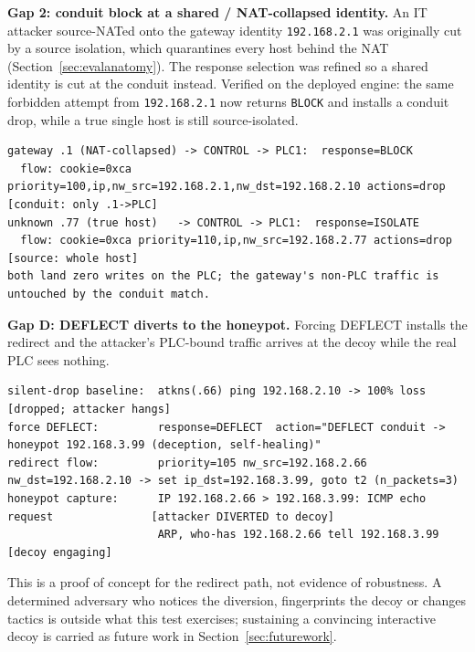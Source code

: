 \noindent\textbf{Gap 2: conduit block at a shared / NAT-collapsed identity.} An IT attacker source-NATed onto the gateway identity \texttt{192.168.2.1} was originally cut by a source isolation, which quarantines every host behind the NAT (Section~\ref{sec:evalanatomy}). The response selection was refined so a shared identity is cut at the conduit instead. Verified on the deployed engine: the same forbidden attempt from \texttt{192.168.2.1} now returns \texttt{BLOCK} and installs a conduit drop, while a true single host is still source-isolated.
\begin{lstlisting}[style=carsdump,caption={Gap 2: shared-identity conduit BLOCK versus single-host source ISOLATE, deployed engine.},label={lst:ev_natblock}]
gateway .1 (NAT-collapsed) -> CONTROL -> PLC1:  response=BLOCK
  flow: cookie=0xca priority=100,ip,nw_src=192.168.2.1,nw_dst=192.168.2.10 actions=drop   [conduit: only .1->PLC]
unknown .77 (true host)   -> CONTROL -> PLC1:  response=ISOLATE
  flow: cookie=0xca priority=110,ip,nw_src=192.168.2.77 actions=drop                       [source: whole host]
both land zero writes on the PLC; the gateway's non-PLC traffic is untouched by the conduit match.
\end{lstlisting}

\noindent\textbf{Gap D: DEFLECT diverts to the honeypot.} Forcing DEFLECT installs the redirect and the attacker's PLC-bound traffic arrives at the decoy while the real PLC sees nothing.
\begin{lstlisting}[style=carsdump,caption={Gap D: silent-drop baseline, the redirect, and the decoy receiving the diverted traffic.},label={lst:ev_deflect}]
silent-drop baseline:  atkns(.66) ping 192.168.2.10 -> 100% loss                       [dropped; attacker hangs]
force DEFLECT:         response=DEFLECT  action="DEFLECT conduit -> honeypot 192.168.3.99 (deception, self-healing)"
redirect flow:         priority=105 nw_src=192.168.2.66 nw_dst=192.168.2.10 -> set ip_dst=192.168.3.99, goto t2 (n_packets=3)
honeypot capture:      IP 192.168.2.66 > 192.168.3.99: ICMP echo request               [attacker DIVERTED to decoy]
                       ARP, who-has 192.168.2.66 tell 192.168.3.99                      [decoy engaging]
\end{lstlisting}

\noindent This is a proof of concept for the redirect path, not evidence of robustness. A determined adversary who notices the diversion, fingerprints the decoy or changes tactics is outside what this test exercises; sustaining a convincing interactive decoy is carried as future work in Section~\ref{sec:futurework}.


